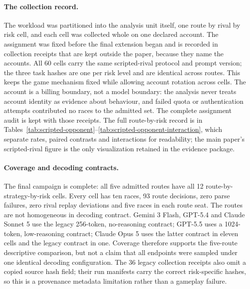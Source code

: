 \documentclass[sigconf,anonymous]{aamas}
\begin{document}
\paragraph{The collection record.} The workload was partitioned into the
analysis unit itself, one route by rival by risk cell, and each cell was
collected whole on one declared account. The assignment was fixed before the
final extension began and is recorded in collection receipts that are kept
outside the paper, because they name the accounts. All 60 cells
carry the same scripted-rival protocol and prompt version; the three task
hashes are one per risk level and are identical across routes. This keeps the
game mechanism fixed while
allowing account rotation across cells. The account is a billing boundary,
not a model boundary: the analysis never treats account identity as evidence
about behaviour, and failed quota or authentication attempts contributed no
races to the admitted set. The complete assignment audit is kept with those
receipts. The full route-by-risk record is in
Tables~\ref{tab:scripted-opponent}--\ref{tab:scripted-opponent-interaction},
which separate rates, paired contrasts and interactions for readability; the
main paper's scripted-rival figure is the only visualization retained in the
evidence package.

\paragraph{Coverage and decoding contracts.} The final campaign is complete:
all five admitted routes have all 12 route-by-strategy-by-risk cells. Every
cell has ten races, 93 route decisions, zero parse failures, zero rival replay
deviations and five races in each route seat. The routes are not homogeneous
in decoding contract. Gemini 3 Flash, GPT-5.4 and Claude Sonnet 5 use the
legacy 256-token, no-reasoning contract; GPT-5.5 uses a 1024-token,
low-reasoning contract; Claude Opus 5 uses the latter contract in eleven cells
and the legacy contract in one. Coverage
therefore supports the five-route descriptive comparison, but not a claim
that all endpoints were sampled under one identical decoding configuration.
The 36 legacy collection receipts also omit a copied source hash field; their
run manifests carry the correct risk-specific hashes, so this is a provenance
metadata limitation rather than a gameplay failure.
\end{document}

